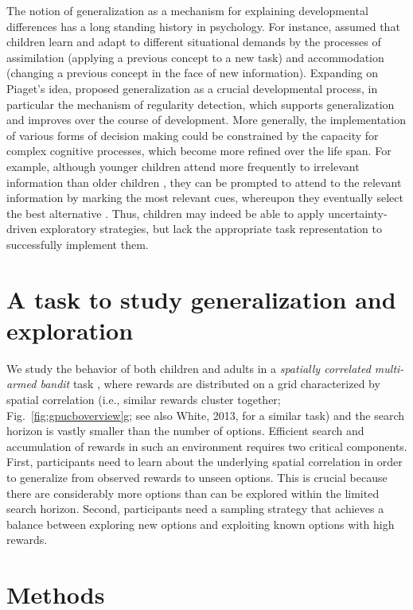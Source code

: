 \documentclass[a4paper,man, floatsintext, natbib]{apa6}
\begin{document}
The notion of generalization as a mechanism for explaining developmental differences has a long standing history in psychology. For instance, \cite{piaget1964part} assumed that children learn and adapt to different situational demands by the processes of assimilation (applying a previous concept to a new task) and accommodation (changing a previous concept in the face of new information). Expanding on Piaget's idea, \cite{klahr1982nonmonotone} proposed generalization as a crucial developmental process, in particular the mechanism of regularity detection, which supports generalization and improves over the course of development. More generally, the implementation of various forms of decision making \citep{hartley2015neuroscience} could be constrained by the capacity for complex cognitive processes, which become more refined over the life span. For example, although younger children attend more frequently to irrelevant information than older children \citep{hagen1973development}, they can be prompted to attend to the relevant information by marking the most relevant cues, whereupon they eventually select the best alternative \citep{davidson1996effects}. Thus, children may indeed be able to apply uncertainty-driven exploratory strategies, but lack the appropriate task representation to successfully implement them.

\section*{A task to study generalization and exploration}
We study the behavior of both children and adults in a \emph{spatially correlated multi-armed bandit} task \citep[Fig.~\ref{fig:gpucboverview}a;][]{wu2018exploration}, where rewards are distributed on a grid characterized by spatial correlation (i.e., similar rewards cluster together; Fig.~\ref{fig:gpucboverview}g; see also White, 2013, for a similar task\nocite{whitegrid}) and the search horizon is vastly smaller than the number of options. Efficient search and accumulation of rewards in such an environment requires two critical components. First, participants need to learn about the underlying spatial correlation in order to generalize from observed rewards to unseen options. This is crucial because there are considerably more options than can be explored within the limited search horizon. Second, participants need a sampling strategy that achieves a balance between exploring new options and exploiting known options with high rewards. 

\section{Methods}
\end{document}
